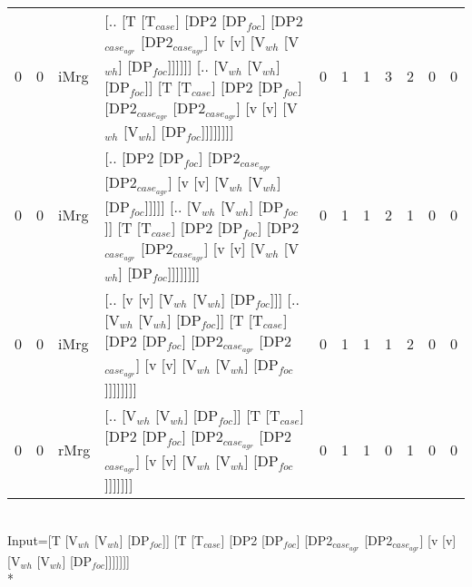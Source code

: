 \begin{tabularx}{\linewidth}{rrlXrrrrrrr}
   0 &   0 & iMrg & [.. [T [T$_{case}$] [DP2 [DP$_{foc}$] [DP2$_{case_{agr}}$ [DP2$_{case_{agr}}$] [v [v] [V$_{wh}$ [V$_{wh}$] [DP$_{foc}$]]]]]] [.. [V$_{wh}$ [V$_{wh}$] [DP$_{foc}$]] [T [T$_{case}$] [DP2 [DP$_{foc}$] [DP2$_{case_{agr}}$ [DP2$_{case_{agr}}$] [v [v] [V$_{wh}$ [V$_{wh}$] [DP$_{foc}$]]]]]]]] &            0 &             1 &             1 &            3 &             2 &              0 &              0 \\
   0 &   0 & iMrg & [.. [DP2 [DP$_{foc}$] [DP2$_{case_{agr}}$ [DP2$_{case_{agr}}$] [v [v] [V$_{wh}$ [V$_{wh}$] [DP$_{foc}$]]]]] [.. [V$_{wh}$ [V$_{wh}$] [DP$_{foc}$]] [T [T$_{case}$] [DP2 [DP$_{foc}$] [DP2$_{case_{agr}}$ [DP2$_{case_{agr}}$] [v [v] [V$_{wh}$ [V$_{wh}$] [DP$_{foc}$]]]]]]]]              &            0 &             1 &             1 &            2 &             1 &              0 &              0 \\
   0 &   0 & iMrg & [.. [v [v] [V$_{wh}$ [V$_{wh}$] [DP$_{foc}$]]] [.. [V$_{wh}$ [V$_{wh}$] [DP$_{foc}$]] [T [T$_{case}$] [DP2 [DP$_{foc}$] [DP2$_{case_{agr}}$ [DP2$_{case_{agr}}$] [v [v] [V$_{wh}$ [V$_{wh}$] [DP$_{foc}$]]]]]]]]                                                           &            0 &             1 &             1 &            1 &             2 &              0 &              0 \\
   0 &   0 & rMrg & [.. [V$_{wh}$ [V$_{wh}$] [DP$_{foc}$]] [T [T$_{case}$] [DP2 [DP$_{foc}$] [DP2$_{case_{agr}}$ [DP2$_{case_{agr}}$] [v [v] [V$_{wh}$ [V$_{wh}$] [DP$_{foc}$]]]]]]]                                                                                               &            0 &             1 &             1 &            0 &             1 &              0 &              0 \\
\hline
\end{tabularx}\endgroup\\
\begingroup\scriptsize Input=[T [V$_{wh}$ [V$_{wh}$] [DP$_{foc}$]] [T [T$_{case}$] [DP2 [DP$_{foc}$] [DP2$_{case_{agr}}$ [DP2$_{case_{agr}}$] [v [v] [V$_{wh}$ [V$_{wh}$] [DP$_{foc}$]]]]]]]\\*
